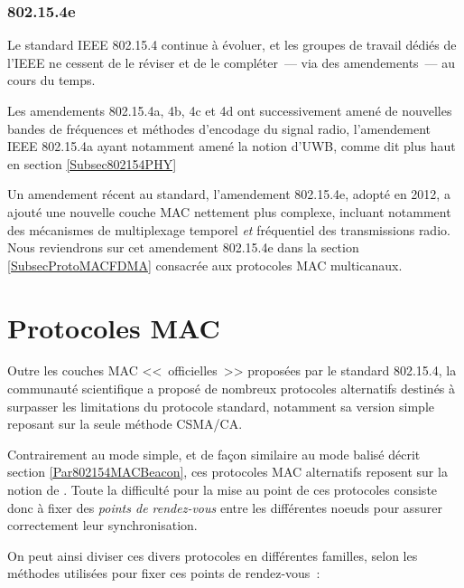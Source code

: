 \subsubsection{802.15.4e}
\label{Par802154e}

Le standard IEEE 802.15.4 continue à évoluer, et les groupes de travail
dédiés de l'IEEE ne cessent de le réviser et de le compléter~--- via
des amendements~--- au cours du temps.

Les amendements 802.15.4a, 4b, 4c et 4d ont successivement amené de
nouvelles bandes de fréquences et méthodes d'encodage du signal radio,
l'amendement IEEE 802.15.4a ayant notamment amené la notion d'UWB,
comme dit plus haut en section \vref{Subsec802154PHY}

Un amendement récent au standard, l'amendement 802.15.4e, adopté en 2012,
a ajouté une nouvelle couche MAC nettement plus complexe, incluant
notamment des mécanismes de multiplexage temporel \emph{et} fréquentiel
des transmissions radio. Nous reviendrons sur cet amendement 802.15.4e
dans la section \vref{SubsecProtoMACFDMA} consacrée aux protocoles MAC
multicanaux.



\section{Protocoles MAC}
\label{SecProtoMAC}

Outre les couches MAC <<~officielles~>> proposées par le standard
802.15.4, la communauté scientifique a proposé de nombreux protocoles
alternatifs destinés à surpasser les limitations du
protocole standard, notamment sa version simple reposant sur la seule
méthode CSMA/CA.

Contrairement au mode simple, et de façon similaire au mode balisé décrit
section \vref{Par802154MACBeacon}, ces protocoles MAC alternatifs
reposent sur la notion de . Toute la difficulté pour
la mise au point de ces protocoles consiste donc à fixer des \emph{points
de rendez-vous} entre les différentes noeuds pour assurer correctement
leur synchronisation.

On peut ainsi diviser ces divers protocoles en différentes familles, selon
les méthodes utilisées pour fixer ces points de rendez-vous~:


